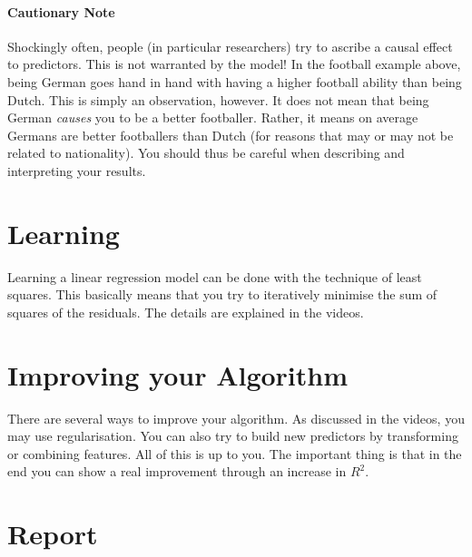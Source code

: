 \documentclass[11pt, leqno, a4paper]{article}
\begin{document}
\paragraph{Cautionary Note} Shockingly often, people (in particular researchers) try to ascribe 
a causal effect to predictors. This is not warranted by the model! In the football example above, being
German goes hand in hand with having a higher football ability than being Dutch. This is simply an 
observation, however. It does not mean that being German \textit{causes} you to be a better footballer.
Rather, it means on average Germans are better footballers than Dutch
(for reasons that may or may not be related to nationality). You
should thus be careful when describing and interpreting your results.

\section{Learning}

Learning a linear regression model can be done with the technique of least squares. This basically
means that you try to iteratively minimise the sum of squares of the residuals. The details are
explained in the videos.

\section{Improving your Algorithm}

There are several ways to improve your algorithm. As discussed in the videos, you may use regularisation.
You can also try to build new predictors by transforming or combining features. All of this
is up to you. The important thing is that in the end you can show a real improvement through an
increase in $ R^{2} $.

\section{Report} \label{sec:report}
\end{document}
